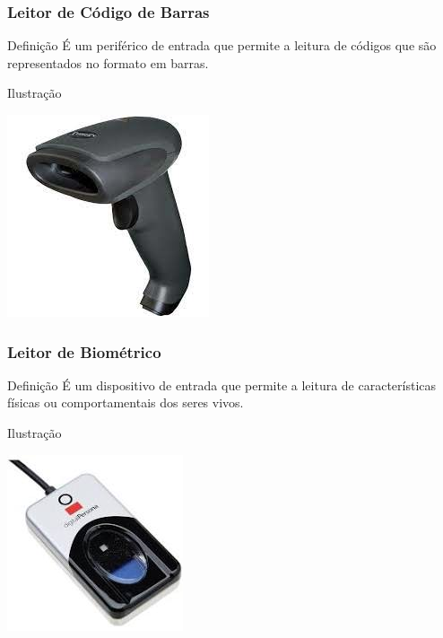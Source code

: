 \documentclass[aspectratio=169]{beamer} %
\begin{document}
\begin{frame}
	\frametitle{Leitor de Código de Barras}
	
	\begin{block}{Defini\c cão}
		É um periférico de entrada que permite a leitura de códigos que são representados no formato em barras.
	\end{block}\vfill
	
	\begin{exampleblock}{Ilustra\c cão}
		\begin{center}
			\includegraphics[scale=0.4]{img/leitor_de_codigo_de_barras}
		\end{center}				
	\end{exampleblock}
\end{frame}

\begin{frame}
	\frametitle{Leitor de Biométrico}
	
	\begin{block}{Defini\c cão}
		É um dispositivo de entrada que permite a leitura de características físicas ou comportamentais dos seres vivos.
	\end{block}\vfill
	
	\begin{exampleblock}{Ilustra\c cão}
		\begin{center}
			\includegraphics[scale=0.5]{img/leitor_biometrico}
		\end{center}		
	\end{exampleblock}
\end{frame}
\end{document}

